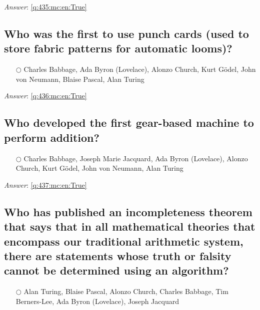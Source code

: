 \documentclass[a4paper,11pt,oneside]{article}
\begin{document}
\begin{sloppypar}
\vspace{1cm}

\textit{Answer}: \autoref{q:435:mc:en:True}



\subsection{Who was the first to use punch cards (used to store fabric patterns for automatic looms)?}

\label{q:436:mc:en:False}

\begin{itemize}
  \item[$\bigcirc$] Charles Babbage, Ada Byron (Lovelace), Alonzo Church, Kurt G\"odel, John von Neumann, Blaise Pascal, Alan Turing
\end{itemize}

\vspace{1cm}

\textit{Answer}: \autoref{q:436:mc:en:True}



\subsection{Who developed the first gear-based machine to perform addition?}

\label{q:437:mc:en:False}

\begin{itemize}
  \item[$\bigcirc$] Charles Babbage, Joseph Marie Jacquard, Ada Byron (Lovelace), Alonzo Church, Kurt G\"odel, John von Neumann, Alan Turing
\end{itemize}

\vspace{1cm}

\textit{Answer}: \autoref{q:437:mc:en:True}



\subsection{Who has published an incompleteness theorem that says that in all mathematical theories that encompass our traditional arithmetic system, there are statements whose truth or falsity cannot be determined using an algorithm?}

\label{q:438:mc:en:False}

\begin{itemize}
  \item[$\bigcirc$] Alan Turing, Blaise Pascal, Alonzo Church, Charles Babbage, Tim Berners-Lee, Ada Byron (Lovelace), Joseph Jacquard
\end{itemize}


\end{sloppypar}
\end{document}

